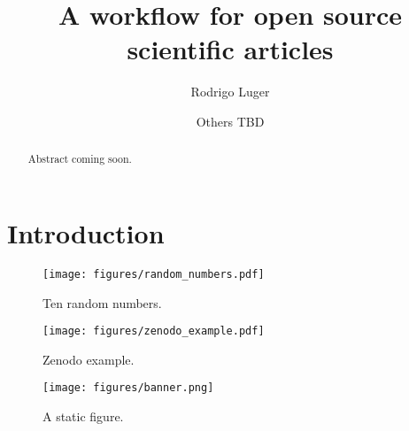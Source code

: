 \documentclass[twocolumn]{aastex631}
\begin{document}
\title{A workflow for open source scientific articles}

\author[0000-0002-0296-3826]{Rodrigo Luger}
\author{Others TBD}

\begin{abstract}
    Abstract coming soon.
\end{abstract}

\section{Introduction}
\label{sec:intro}

\begin{figure}[ht!]
    \begin{centering}
        \texttt{[image: figures/random\_numbers.pdf]}
        \caption{Ten random numbers.}
        \label{fig:random_numbers}
    \end{centering}
\end{figure}

\begin{figure}[ht!]
    \begin{centering}
        \texttt{[image: figures/zenodo\_example.pdf]}
        \caption{Zenodo example.}
        \label{fig:zenodo_example}
    \end{centering}
\end{figure}

\begin{figure}[th!]
    \begin{centering}
        \texttt{[image: figures/banner.png]}
        \caption{A static figure.}
        \label{fig:banner}
    \end{centering}
\end{figure}


\end{document}
